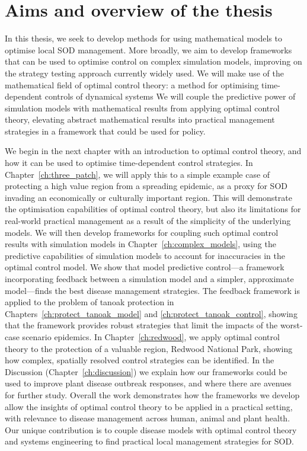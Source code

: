 \section{Aims and overview of the thesis}

In this thesis, we seek to develop methods for using mathematical models to optimise local SOD management. More broadly, we aim to develop frameworks that can be used to optimise control on complex simulation models, improving on the strategy testing approach currently widely used. We will make use of the mathematical field of optimal control theory: a method for optimising time-dependent controls of dynamical systems We will couple the predictive power of simulation models with mathematical results from applying optimal control theory, elevating abstract mathematical results into practical management strategies in a framework that could be used for policy.

We begin in the next chapter with an introduction to optimal control theory, and how it can be used to optimise time-dependent control strategies. In Chapter~\ref{ch:three_patch}, we will apply this to a simple example case of protecting a high value region from a spreading epidemic, as a proxy for SOD invading an economically or culturally important region. This will demonstrate the optimisation capabilities of optimal control theory, but also its limitations for real-world practical management as a result of the simplicity of the underlying models. We will then develop frameworks for coupling such optimal control results with simulation models in Chapter~\ref{ch:complex_models}, using the predictive capabilities of simulation models to account for inaccuracies in the optimal control model. We show that model predictive control---a framework incorporating feedback between a simulation model and a simpler, approximate model---finds the best disease management strategies. The feedback framework is applied to the problem of tanoak protection in Chapters~\ref{ch:protect_tanoak_model} and \ref{ch:protect_tanoak_control}, showing that the framework provides robust strategies that limit the impacts of the worst-case scenario epidemics. In Chapter~\ref{ch:redwood}, we apply optimal control theory to the protection of a valuable region, Redwood National Park, showing how complex, spatially resolved control strategies can be identified. In the Discussion (Chapter~\ref{ch:discussion}) we explain how our frameworks could be used to improve plant disease outbreak responses, and where there are avenues for further study. Overall the work demonstrates how the frameworks we develop allow the insights of optimal control theory to be applied in a practical setting, with relevance to disease management across human, animal and plant health. Our unique contribution is to couple disease models with optimal control theory and systems engineering to find practical local management strategies for SOD.